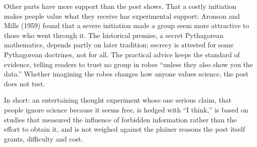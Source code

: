 \begin{afterword}
Other parts have more support than the post shows. That a costly initiation makes people value what they receive has experimental support: Aronson and Mills (1959) found that a severe initiation made a group seem more attractive to those who went through it. The historical premise, a secret Pythagorean mathematics, depends partly on later tradition; secrecy is attested for some Pythagorean doctrines, not for all. The practical advice keeps the standard of evidence, telling readers to trust no group in robes ``unless they also show you the data.'' Whether imagining the robes changes how anyone values science, the post does not test.

In short: an entertaining thought experiment whose one serious claim, that people ignore science because it seems free, is hedged with ``I think,'' is based on studies that measured the influence of forbidden information rather than the effort to obtain it, and is not weighed against the plainer reasons the post itself grants, difficulty and cost.
\end{afterword}
